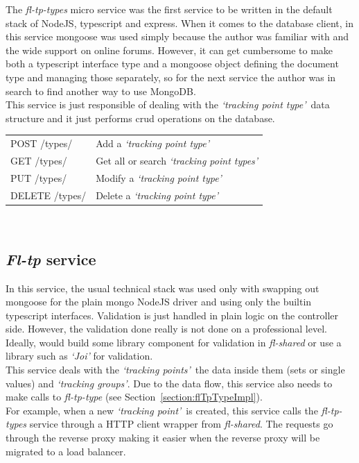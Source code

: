 \documentclass{article}
\newcommand{\vspaceconst}{-2ex}
\newcommand{\tpt}{\textit{`tracking point type'}}
\newcommand{\tpts}{\textit{`tracking point types'}}
\newcommand{\tp}{\textit{`tracking point'}}
\newcommand{\tps}{\textit{`tracking points'}}
\newcommand{\tgs}{\textit{`tracking groups'}}
\begin{document}
\begin{multicols}{2}
The \textit{fl-tp-types} micro service was the first service to be written in the default stack of NodeJS, typescript and express.  When it comes to the database client, in this service mongoose was used simply because the author was familiar with and the wide support on online forums. However, it can get cumbersome to make both a typescript interface type and a mongoose object defining the document type and managing those separately, so for the next service the author was in search to find another way to use MongoDB.\\
This service is just responsible of dealing with the \tpt~data structure and it just performs crud operations on the database.\\

\begingroup
\centering
\begin{tabular}{p{2.5cm} p{4.5cm}}
  POST /types/ & Add a \tpt\\
  GET /types/ & Get all or search \tpts\\
  PUT /types/ & Modify a \tpt\\
  DELETE /types/ & Delete a \tpt\\
\end{tabular}
~\label{table:flTpTypesEndpoints}
\endgroup

\subsection{\textit{Fl-tp} service}
\vspace{\vspaceconst}
In this service, the usual technical stack was used only with swapping out mongoose for the plain mongo NodeJS driver and using only the builtin typescript interfaces. Validation is just handled in plain logic on the controller side. However, the validation done really is not done on a professional level. Ideally, would build some library component for validation in \textit{fl-shared} or use a library such as \textit{`Joi'} for validation.\\
This service deals with the \tps~the data inside them (sets or single values) and \tgs. Due to the data flow, this service also needs to make calls to \textit{fl-tp-type} (see Section~\ref{section:flTpTypeImpl}).\\
For example, when a new \tp~is created, this service calls the \textit{fl-tp-types} service through a HTTP client wrapper from \textit{fl-shared}. The requests go through the reverse proxy making it easier when the reverse proxy will be migrated to a load balancer.\\


\end{multicols}
\end{document}
